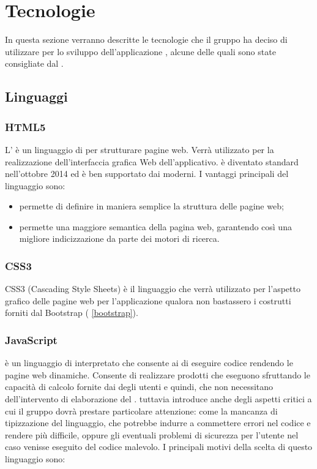 \documentclass[12pt,a4paper]{article}
\begin{document}
\newpage

\section{Tecnologie}\label{tecnologie}
In questa sezione verranno descritte le tecnologie che il gruppo ha deciso di utilizzare per lo sviluppo dell'applicazione \prjL{}, alcune delle quali sono state consigliate dal .

\subsection{Linguaggi}
\subsubsection{HTML5}\label{html}
L’ è un linguaggio di  per strutturare pagine web. Verrà utilizzato per la realizzazione dell’interfaccia grafica Web dell’applicativo.  è diventato standard  nell’ottobre 2014 ed è ben supportato dai  moderni. I vantaggi principali del linguaggio sono:

\begin{itemize}
	\item permette di definire in maniera semplice la struttura delle pagine web;
	\item permette una maggiore semantica della pagina web, garantendo così una migliore indicizzazione da parte dei motori di ricerca.
\end{itemize}

\subsubsection{CSS3}\label{css}
CSS3 (Cascading Style Sheets) è il linguaggio che verrà utilizzato per l’aspetto grafico delle pagine web per l'applicazione qualora non bastassero i costrutti forniti dal  Bootstrap ( \ref{bootstrap}).

\subsubsection{JavaScript}\label{javascript}
 è un linguaggio di  interpretato che consente ai  di eseguire codice rendendo le pagine web dinamiche. Consente di realizzare prodotti  che eseguono sfruttando le capacità di calcolo fornite dai  degli utenti e quindi, che non necessitano dell’intervento di elaborazione del .  tuttavia introduce anche degli aspetti critici a cui il gruppo dovrà prestare particolare attenzione: come la mancanza di tipizzazione del linguaggio, che potrebbe indurre a commettere errori nel codice e rendere più difficile, oppure gli eventuali problemi di sicurezza per l'utente nel caso venisse eseguito del codice malevolo. I principali motivi della scelta di questo linguaggio sono:
\end{document}
